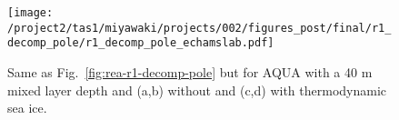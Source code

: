 \documentclass{ametsocV5}
\begin{document}
\begin{figure}[t]
    \noindent\texttt{[image: /project2/tas1/miyawaki/projects/002/figures\_post/final/r1\_decomp\_pole/r1\_decomp\_pole\_echamslab.pdf]}\\
    \caption{Same as Fig.~\ref{fig:rea-r1-decomp-pole} but for AQUA with a 40 m mixed layer depth and (a,b) without and (c,d) with thermodynamic sea ice.}
    \label{fig:echam-rae}
\end{figure}



\end{document}

